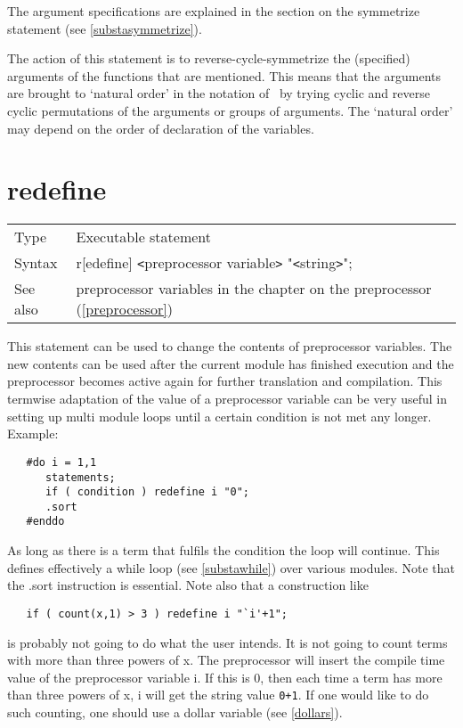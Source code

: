\noindent The argument specifications are explained 
in the section on the symmetrize statement (see 
\ref{substasymmetrize}). \medskip

\noindent The action of this statement is to
reverse-cycle-symmetrize
 the (specified) arguments of the functions 
that are mentioned. This means that the arguments are brought to `natural 
order' in the notation of \FORM\ by trying cyclic and reverse cyclic 
permutations of the arguments or groups of arguments. 
The `natural order' may depend on the order of declaration of the 
variables. \vspace{10mm}


\section{redefine}
\label{substaredefine}

\noindent \begin{tabular}{ll}
Type & Executable statement\\
Syntax & r[edefine] {\tt<}preprocessor variable{\tt>} "{\tt<}string{\tt>}";
\\ See also & preprocessor variables in the chapter on the preprocessor 
    (\ref{preprocessor})
\end{tabular} \vspace{4mm}

\noindent This statement can be used to change the contents 
of preprocessor 
variables. The new contents can be used after 
the current module has finished execution and the preprocessor becomes 
active again for further translation and compilation. 
This termwise adaptation of the value of a preprocessor variable can be 
very useful in setting up multi module loops until a certain condition is 
not met any longer. Example:
\begin{verbatim}
   #do i = 1,1
      statements;
      if ( condition ) redefine i "0";
      .sort
   #enddo
\end{verbatim}
As long as there is a term that fulfils the condition the loop 
will continue. This defines effectively a while loop (see 
\ref{substawhile}) over various modules. Note that the .sort 
instruction is essential. Note also that a construction like
\begin{verbatim}
   if ( count(x,1) > 3 ) redefine i "`i'+1";
\end{verbatim}
is probably not going to do what the user intends. It is not going to count 
terms with more than three powers of x. The preprocessor will insert the 
compile time value of the preprocessor variable i. If this is 0, then each 
time a term has more than three powers of x, i will get the string value 
\verb:0+1:. If one would like to do such counting, one should use a 
dollar variable (see \ref{dollars}). \vspace{10mm}

